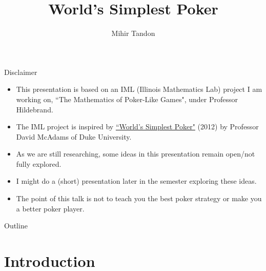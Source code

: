 \documentclass[aspectratio=169]{beamer}
\title{World's Simplest Poker}
\author{Mihir Tandon}
\date{}
\begin{document}

\begin{frame}
\titlepage
\end{frame}

\begin{frame}{Disclaimer}
    \begin{itemize}
        \item This presentation is based on an IML (Illinois Mathematics Lab) project I am working on, ``The Mathematics of Poker-Like Games", under Professor  Hildebrand.
        \item The IML project is inspired by \href{https://cheaptalk.org/wp-content/uploads/2012/11/worlds-simplest-poker.pdf}{``World's Simplest Poker"} (2012) by Professor David McAdams of Duke University.
        \item As we are still researching, some ideas in this presentation remain open/not fully explored.
        \item I might do a (short) presentation later in the semester exploring these ideas.
        \item The point of this talk is not to teach you the best poker strategy or make you a better poker player.
    \end{itemize}
\end{frame}
\begin{frame}{Outline}
  \tableofcontents
  \end{frame}
\section{Introduction}
\frame{\sectionpage}
\end{document}
